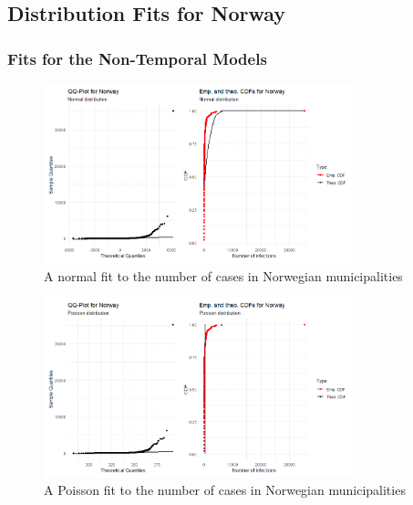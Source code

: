 \subsection{Distribution Fits for Norway}
\subsubsection{Fits for the Non-Temporal Models}\label{sec:temp_fit_norway}
\begin{figure}[H]
    \centering
    \includegraphics[width = 0.8\textwidth]{fit_normal_norway.png}
    \caption{A normal fit to the number of cases in Norwegian municipalities}
    \label{fitNormalNorway}
\end{figure}
\begin{figure}[H]
    \centering
    \includegraphics[width = 0.8\textwidth]{fit_poisson_norway.png}
    \caption{A Poisson fit to the number of cases in Norwegian municipalities}
    \label{fitPoissonNorway}
\end{figure}
\clearpage
